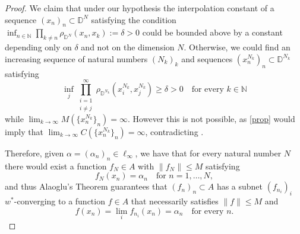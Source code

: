 \documentclass[preprint,12pt,number]{elsarticle}
\newcommand{\N}{\mathbb{N}}
\newcommand{\D}{\mathbb{D}}
\begin{document}
\begin{proof}
    We claim that under our hypothesis the interpolation constant of a sequence $(x_n)_n\subset \D^N$ satisfying the condition $\inf_{n\in\N}\prod_{k\neq n}\rho_{\D^N}(x_n,x_k):=\delta>0$ could be bounded above by a constant depending only on $\delta$ and not on the dimension $N$. Otherwise, we could find an increasing sequence of natural numbers $(N_k)_k$ and sequences $(x_n^{N_k})_n\subset \D^{N_k}$ satisfying 
    \[
    \inf_{j}\prod_{\substack{i=1\\ i\neq j}}^\infty\rho_{\D^{N_k}}(x_i^{N_k},x_j^{N_k})\geq\delta>0\quad \text{for every } k\in\N 
    \] 
    while $\lim_{k\to\infty}M(\{x_n^{N_k}\}_n)=\infty$. However this is not possible, as \eqref{prop} would imply that $\lim_{k\to\infty}C(\{x_n^{N_k}\}_n)=\infty$, contradicting \cite[Proposition 6]{BerndtssonChangLin1987}. 
    
    Therefore, given $\alpha=(\alpha_n)_n\in\ell_\infty$, we have that for every natural number $N$ there would exist a function $f_N\in A$ with $\lVert f_N\rVert\leq M$ satisfying 
    \[
    f_N(x_n)=\alpha_n\quad \text{for } n=1,\dots,N,
    \] 
    and thus Alaoglu's Theorem guarantees that $(f_n)_n\subset A$ has a subnet $(f_{n_i})_i$ $w^*$-converging to a function $f\in A$ that necessarily satisfies $\lVert f \rVert\leq M$ and 
    \[
    f(x_n)=\lim_i f_{n_i}(x_n)=\alpha_n\quad \text{for every } n.
    \]
\end{proof}
\end{document}
